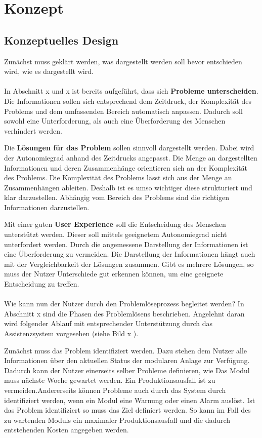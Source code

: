 \chapter{Konzept}
\label{sec:Konzept}


\section{Konzeptuelles Design}
Zunächst muss geklärt werden, was dargestellt werden soll bevor entschieden wird, wie es dargestellt wird.
\\ \\
In Abschnitt x und x ist bereits aufgeführt, dass sich \textbf{Probleme unterscheiden}. Die Informationen sollen sich entsprechend dem Zeitdruck, der Komplexität des Problems und dem umfassenden Bereich automatisch anpassen. Dadurch soll sowohl eine Unterforderung, als auch eine Überforderung des Menschen verhindert werden.

Die \textbf{Lösungen für das Problem} sollen sinnvoll dargestellt werden. Dabei wird der Autonomiegrad anhand des Zeitdrucks angepasst. Die Menge an dargestellten Informationen und deren Zusammenhänge orientieren sich an der Komplexität des Problems. Die Komplexität des Problems lässt sich aus der Menge an Zusammenhängen ableiten. Deshalb ist es umso wichtiger diese strukturiert und klar darzustellen. Abhängig vom Bereich des Problems sind die richtigen Informationen darzustellen.

Mit einer guten \textbf{User Experience} soll die Entscheidung des Menschen unterstützt werden. Dieser soll mittels geeignetem Autonomiegrad nicht unterfordert werden. Durch die angemessene Darstellung der Informationen ist eine Überforderung zu vermeiden. Die Darstellung der Informationen hängt auch mit der Vergleichbarkeit der Lösungen zusammen. Gibt es mehrere Lösungen, so muss der Nutzer Unterschiede gut erkennen können, um eine geeignete Entscheidung zu treffen. 
\\ \\
Wie kann nun der Nutzer durch den Problemlöseprozess begleitet werden? In Abschnitt x sind die Phasen des Problemlösens beschrieben. Angelehnt daran wird folgender Ablauf mit entsprechender Unterstützung durch das Assistenzsystem vorgesehen (siehe Bild x ).

Zunächst muss das Problem identifiziert werden. Dazu stehen dem Nutzer alle Informationen über den aktuellen Status der modularen Anlage zur Verfügung. Dadurch kann der Nutzer einerseits selber Probleme definieren, wie \glqq Das Modul muss nächste Woche gewartet werden. Ein Produktionsausfall ist zu vermeiden.\grqq Andererseits können Probleme auch durch das System durch identifiziert werden, wenn ein Modul eine Warnung oder einen Alarm auslöst. Ist das Problem identifiziert so muss das Ziel definiert werden. So kann im Fall des zu wartenden Moduls ein maximaler Produktionsausfall und die dadurch entstehenden Kosten angegeben werden.

